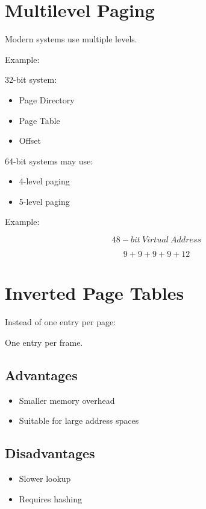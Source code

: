 \section{Multilevel Paging}

Modern systems use multiple levels.

Example:

32-bit system:

\begin{itemize}
\item Page Directory
\item Page Table
\item Offset
\end{itemize}

64-bit systems may use:

\begin{itemize}
\item 4-level paging
\item 5-level paging
\end{itemize}

Example:

\[
48-bit\ Virtual\ Address
\]

\[
9+9+9+9+12
\]

\section{Inverted Page Tables}

Instead of one entry per page:

One entry per frame.

\subsection{Advantages}

\begin{itemize}
\item Smaller memory overhead
\item Suitable for large address spaces
\end{itemize}

\subsection{Disadvantages}

\begin{itemize}
\item Slower lookup
\item Requires hashing
\end{itemize}

